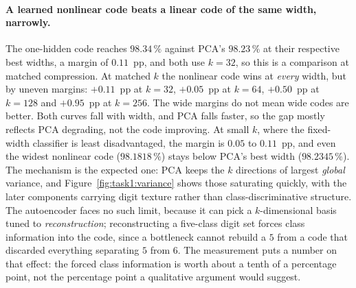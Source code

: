 \documentclass[11pt,a4paper]{article}
\begin{document}
\paragraph{A learned nonlinear code beats a linear code of the same width, narrowly.}
The one-hidden code reaches $98.34\,\%$ against PCA's $98.23\,\%$ at their respective best widths,
a margin of $0.11$~pp, and both use $k=32$, so this is a comparison at matched compression.  At
matched $k$ the nonlinear code wins at \emph{every} width, but by uneven margins: $+0.11$~pp at
$k=32$, $+0.05$~pp at $k=64$, $+0.50$~pp at $k=128$ and $+0.95$~pp at $k=256$.  The wide margins do
not mean wide codes are better.  Both curves fall with width, and PCA falls faster, so the gap
mostly reflects PCA degrading, not the code improving.  At small $k$, where the fixed-width
classifier is least disadvantaged, the margin is $0.05$ to $0.11$~pp, and even the widest
nonlinear code ($98.1818\,\%$) stays below PCA's best width ($98.2345\,\%$).
The mechanism is the expected one: PCA keeps the $k$ directions of largest \emph{global}
variance, and Figure~\ref{fig:task1:variance} shows those saturating quickly, with the later
components carrying digit texture rather than class-discriminative structure.  The autoencoder
faces no such limit, because it can pick a $k$-dimensional basis tuned to \emph{reconstruction};
reconstructing a five-class digit set forces class information into the code, since a bottleneck
cannot rebuild a $5$ from a code that discarded everything separating $5$ from $6$.  The
measurement puts a number on that effect: the forced class information is worth about a tenth of
a percentage point, not the percentage point a qualitative argument would suggest.
\end{document}
